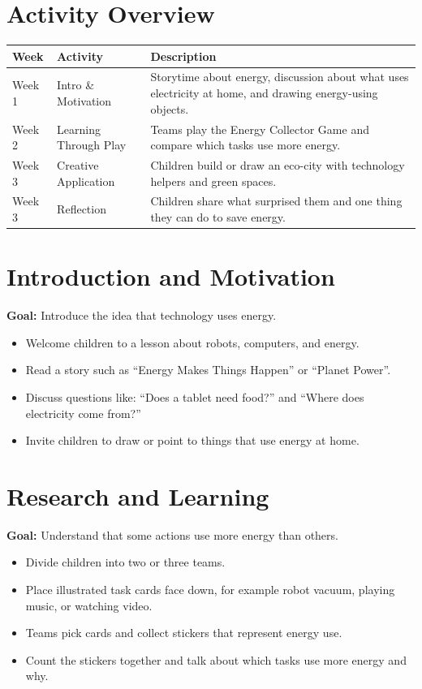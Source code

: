 \documentclass[11pt, a4paper]{article}
\begin{document}
\section*{Activity Overview}
\begingroup
\small
\begin{tabularx}{\textwidth}{|l|l|L|}
    \hline
     \textbf{Week} & \textbf{Activity} & \textbf{Description} \\ \hline
    Week 1 & Intro \& Motivation & Storytime about energy, discussion about what uses electricity at home, and drawing energy-using objects. \\ \hline
    Week 2 & Learning Through Play & Teams play the Energy Collector Game and compare which tasks use more energy. \\ \hline
    Week 3 & Creative Application & Children build or draw an eco-city with technology helpers and green spaces. \\ \hline
    Week 3 & Reflection & Children share what surprised them and one thing they can do to save energy. \\ \hline
\end{tabularx}
\endgroup

\section{Introduction and Motivation}
\textbf{Goal:} Introduce the idea that technology uses energy.
\begin{itemize}
    \item Welcome children to a lesson about robots, computers, and energy.
    \item Read a story such as ``Energy Makes Things Happen'' or ``Planet Power''.
    \item Discuss questions like: ``Does a tablet need food?'' and ``Where does electricity come from?''
    \item Invite children to draw or point to things that use energy at home.
\end{itemize}

\section{Research and Learning}
\textbf{Goal:} Understand that some actions use more energy than others.
\begin{itemize}
    \item Divide children into two or three teams.
    \item Place illustrated task cards face down, for example robot vacuum, playing music, or watching video.
    \item Teams pick cards and collect stickers that represent energy use.
    \item Count the stickers together and talk about which tasks use more energy and why.
\end{itemize}
\end{document}
